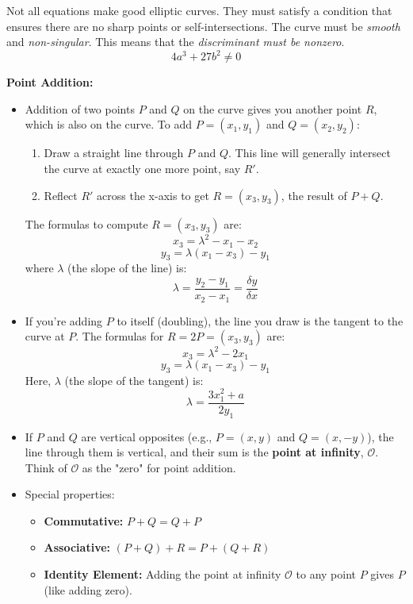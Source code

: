 Not all equations make good elliptic curves. They must satisfy a condition that ensures there are no sharp points or self-intersections. The curve must be \emph{smooth} and \emph{non-singular}. This means that the \emph{discriminant must be nonzero}.
\[ 4a^3 + 27b^2 \neq 0 \]

\textbf{Point Addition:} 
\begin{itemize}
    \item Addition of two points $P$ and $Q$ on the curve gives you another point $R$, which is also on the curve. 
            To add \( P = (x_1, y_1) \) and \( Q = (x_2, y_2) \):
            \begin{enumerate}
                \item Draw a straight line through \( P \) and \( Q \). This line will generally intersect the curve at exactly one more point, say \( R' \).
                \item Reflect \( R' \) across the x-axis to get \( R = (x_3, y_3) \), the result of \( P + Q \).
            \end{enumerate}
            The formulas to compute \( R = (x_3, y_3) \) are:
            \[
            x_3 = \lambda^2 - x_1 - x_2
            \]
            \[
            y_3 = \lambda(x_1 - x_3) - y_1
            \]
            where \( \lambda \) (the slope of the line) is:
            \[
            \lambda = \frac{y_2 - y_1}{x_2 - x_1} = \frac{\delta y}{\delta x}
            \]
    \item If you’re adding $P$ to itself (doubling), the line you draw is the tangent to the curve at $P$.
    The formulas for \( R = 2P = (x_3, y_3) \) are:
    \[
    x_3 = \lambda^2 - 2x_1
    \]
    \[
    y_3 = \lambda(x_1 - x_3) - y_1
    \]
    Here, \( \lambda \) (the slope of the tangent) is:
    \[
    \lambda = \frac{3x_1^2 + a}{2y_1}
    \]
    \item If \( P \) and \( Q \) are vertical opposites (e.g., \( P = (x, y) \) and \( Q = (x, -y) \)), the line through them is vertical, and their sum is the \textbf{point at infinity}, \( \mathcal{O} \). Think of \( \mathcal{O} \) as the "zero" for point addition.
    \item Special properties:
    \begin{itemize}
        \item \textbf{Commutative:} \( P + Q = Q + P \)
        \item \textbf{Associative:} \( (P + Q) + R = P + (Q + R) \)
        \item \textbf{Identity Element:} Adding the point at infinity \( \mathcal{O} \) to any point \( P \) gives \( P \) (like adding zero).
    \end{itemize}
\end{itemize}


